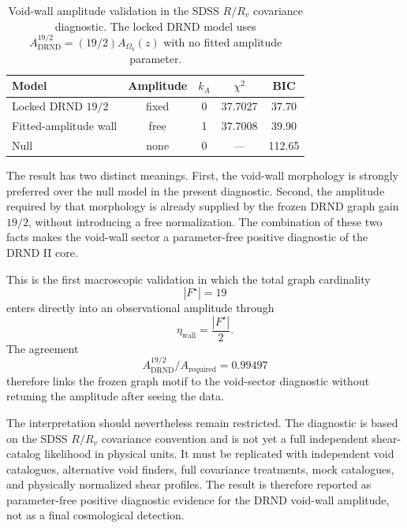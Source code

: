 \documentclass[12pt]{iopart}
\begin{document}
\begin{table}[htbp]
\caption{Void-wall amplitude validation in the SDSS \(R/R_v\) covariance diagnostic. The locked DRND model uses \(A_{\mathrm{DRND}}^{19/2}=(19/2)A_{\Omega_b}(z)\) with no fitted amplitude parameter.}
\label{tab:void_amplitude_validation}
\begin{center}
\small
\begin{tabular}{lcccc}
\hline
\textbf{Model} & \textbf{Amplitude} & \(k_A\) & \(\chi^2\) & \textbf{BIC} \\
\hline
Locked DRND \(19/2\) & fixed & 0 & 37.7027 & 37.70 \\
Fitted-amplitude wall & free & 1 & 37.7008 & 39.90 \\
Null & none & 0 & --- & 112.65 \\
\hline
\end{tabular}
\end{center}
\end{table}

The result has two distinct meanings. First, the void-wall morphology is strongly preferred over the null model in the present diagnostic. Second, the amplitude required by that morphology is already supplied by the frozen DRND graph gain \(19/2\), without introducing a free normalization. The combination of these two facts makes the void-wall sector a parameter-free positive diagnostic of the DRND II core.

This is the first macroscopic validation in which the total graph cardinality
\begin{equation}
|F^\star|=19
\end{equation}
enters directly into an observational amplitude through
\begin{equation}
\eta_{\mathrm{wall}}=\frac{|F^\star|}{2}.
\end{equation}
The agreement
\begin{equation}
A_{\mathrm{DRND}}^{19/2}/A_{\mathrm{required}}=0.99497
\end{equation}
therefore links the frozen graph motif to the void-sector diagnostic without retuning the amplitude after seeing the data.

The interpretation should nevertheless remain restricted. The diagnostic is based on the SDSS \(R/R_v\) covariance convention and is not yet a full independent shear-catalog likelihood in physical units. It must be replicated with independent void catalogues, alternative void finders, full covariance treatments, mock catalogues, and physically normalized shear profiles. The result is therefore reported as parameter-free positive diagnostic evidence for the DRND void-wall amplitude, not as a final cosmological detection.
\end{document}
